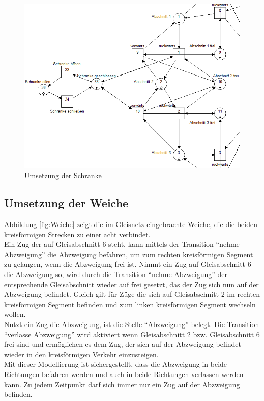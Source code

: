 \documentclass[10pt]{scrartcl}
\begin{document}
\begin{figure}[htbp]
	\centering	\includegraphics[width=1.0\textwidth]{Bilder/Aufgabe2_Schranke.png}
	\caption{Umsetzung der Schranke}
	\label{fig:Schranke}
\end{figure}

\subsection{Umsetzung der Weiche}
Abbildung \ref{fig:Weiche} zeigt die im Gleisnetz eingebrachte Weiche, die die beiden kreisförmigen Strecken zu einer acht verbindet.\\
Ein Zug der auf Gleisabschnitt 6 steht, kann mittels der Transition "`nehme Abzweigung"' die Abzweigung befahren, um zum rechten kreisförmigen Segment zu gelangen, wenn die Abzweigung frei ist. Nimmt ein Zug auf Gleisabschnitt 6 die Abzweigung so, wird durch die Transition "`nehme Abzweigung"' der entsprechende Gleisabschnitt wieder auf frei gesetzt, das der Zug sich nun auf der Abzweigung befindet. Gleich gilt für Züge die sich auf Gleisabschnitt 2 im rechten kreisförmigen Segment befinden  und zum linken kreisförmigen Segment wechseln wollen.\\
Nutzt ein Zug die Abzweigung, ist die Stelle  "`Abzweigung"' belegt. Die Transition  "`verlasse Abzweigung"' wird aktiviert wenn Gleisabschnitt 2 bzw. Gleisabschnitt 6 frei sind und ermöglichen es dem Zug, der sich auf der Abzweigung befindet wieder in den kreisförmigen Verkehr einzusteigen.\\
Mit dieser Modellierung ist sichergestellt, dass die Abzweigung in beide Richtungen befahren werden und auch in beide Richtungen verlassen werden kann. Zu jedem Zeitpunkt darf sich immer nur ein Zug auf der Abzweigung befinden.
\end{document}
